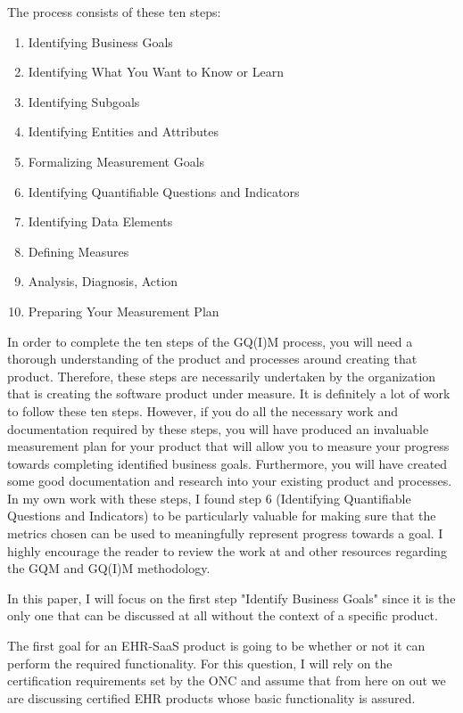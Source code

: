 \documentclass[10pt]{article}
\begin{document}
The process consists of these ten steps:
\begin{enumerate}
	\item Identifying Business Goals
	\item Identifying What You Want to Know or Learn 
	\item Identifying Subgoals
	\item Identifying Entities and Attributes
	\item Formalizing Measurement Goals
	\item Identifying Quantifiable Questions and Indicators 
	\item Identifying Data Elements
	\item Defining Measures
	\item Analysis, Diagnosis, Action
	\item Preparing Your Measurement Plan
\end{enumerate}

In order to complete the ten steps of the GQ(I)M process, you will need a thorough understanding of the product and processes around creating that product.
Therefore, these steps are necessarily undertaken by the organization that is creating the software product under measure.
It is definitely a lot of work to follow these ten steps.
However, if you do all the necessary work and documentation required by these steps, you will have produced an invaluable measurement plan for your product that will allow you to measure your progress towards completing identified business goals.
Furthermore, you will have created some good documentation and research into your existing product and processes.
In my own work with these steps, I found step 6 (Identifying Quantifiable Questions and Indicators) to be particularly valuable for making sure that the metrics chosen can be used to meaningfully represent progress towards a goal.
I highly encourage the reader to review the work at \cite{sei-gqim} and other resources regarding the GQM and GQ(I)M methodology.

In this paper, I will focus on the first step "Identify Business Goals" since it is the only one that can be discussed at all without the context of a specific product.

The first goal for an EHR-SaaS product is going to be whether or not it can perform the required functionality.
For this question, I will rely on the certification requirements set by the ONC and assume that from here on out we are discussing certified EHR products whose basic functionality is assured.
\end{document}
